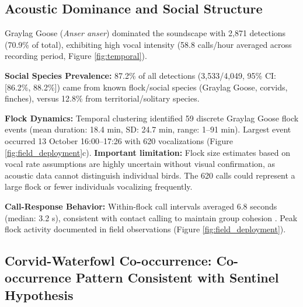 \documentclass[twocolumn]{article}
\begin{document}
\subsection{Acoustic Dominance and Social Structure}

Graylag Goose (\textit{Anser anser}) dominated the soundscape with 2,871 detections (70.9\% of total), exhibiting high vocal intensity (58.8 calls/hour averaged across recording period, Figure \ref{fig:temporal}).

\textbf{Social Species Prevalence:} 87.2\% of all detections (3,533/4,049, 95\% CI: [86.2\%, 88.2\%]) came from known flock/social species (Graylag Goose, corvids, finches), versus 12.8\% from territorial/solitary species.

\textbf{Flock Dynamics:} Temporal clustering identified 59 discrete Graylag Goose flock events (mean duration: 18.4 min, SD: 24.7 min, range: 1--91 min). Largest event occurred 13 October 16:00--17:26 with 620 vocalizations (Figure \ref{fig:field_deployment}c). \textbf{Important limitation:} Flock size estimates based on vocal rate assumptions are highly uncertain without visual confirmation, as acoustic data cannot distinguish individual birds. The 620 calls could represent a large flock or fewer individuals vocalizing frequently.

\textbf{Call-Response Behavior:} Within-flock call intervals averaged 6.8 seconds (median: 3.2 s), consistent with contact calling to maintain group cohesion \citep{Black2019}. Peak flock activity documented in field observations (Figure \ref{fig:field_deployment}).

\subsection{Corvid-Waterfowl Co-occurrence: Co-occurrence Pattern Consistent with Sentinel Hypothesis}
\end{document}
